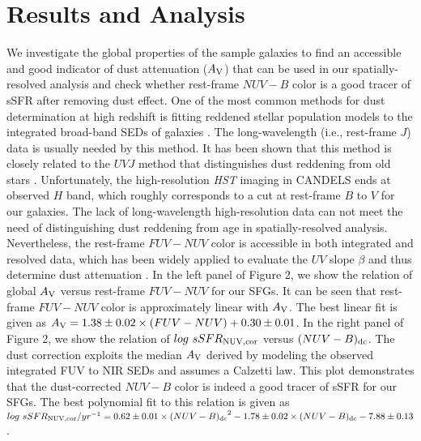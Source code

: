 \documentclass[twocolumn]{aastex61}
\begin{document}
\section{Results and Analysis}

We investigate the global properties of the sample galaxies to find an accessible and good 
indicator of dust attenuation ($A_{\rm V}$) that can be used in our spatially-resolved analysis 
and check whether rest-frame $NUV-B$ color is a good tracer of sSFR after removing 
dust effect. One of the most common methods for dust determination at high redshift is 
fitting reddened stellar population models to the integrated broad-band 
SEDs of galaxies \citep[e.g.,][]{Kriek+09}. 
The long-wavelength (i.e., rest-frame $J$) data is usually needed by this method. 
It has been shown that this method 
is closely related to the $UVJ$ method that distinguishes dust reddening 
from old stars \citep[][]{Patel11}. 
Unfortunately, the high-resolution {\it HST} imaging in CANDELS ends at observed $H$ band, 
which roughly corresponds to a cut at rest-frame $B$ to $V$ for our galaxies. 
The lack of long-wavelength high-resolution data can not meet the need of distinguishing dust 
reddening from age in spatially-resolved analysis. 
%
Nevertheless, the rest-frame $FUV-NUV$ color is accessible in both integrated and resolved data, 
which has been widely applied to evaluate the $UV$ slope $\beta$ and thus determine dust attenuation 
\citep[e.g.,][]{Buat05,Munoz07,Reddy12}. 
In the left panel of Figure 2, we show the relation of global $A_{\rm V}$ versus 
rest-frame $FUV-NUV$ for our SFGs. It can be seen that rest-frame $FUV-NUV$ color 
is approximately linear with $A_{\rm V}$. 
The best linear fit is given as $ A_{\rm V} = 1.38\pm0.02 \times (FUV-NUV) + 0.30\pm0.01$. 
In the right panel of Figure 2, we show the relation of $log~sSFR_{\rm NUV,cor}$ versus $(NUV-B)_{\rm dc}$. 
The dust correction exploits the median $A_{\rm V}$ derived 
by modeling the observed integrated FUV to NIR SEDs and assumes a Calzetti law. 
This plot demonstrates that the dust-corrected $NUV-B$ color is indeed a good 
tracer of sSFR for our SFGs. 
The best polynomial fit to this relation is given as 
$log~sSFR_{\rm NUV,cor}/yr^{-1}=0.62\pm0.01 \times {(NUV-B)_{\rm dc}}^2-1.78\pm0.02 \times 
(NUV-B)_{\rm dc} -7.88\pm0.13$. 
\end{document}
